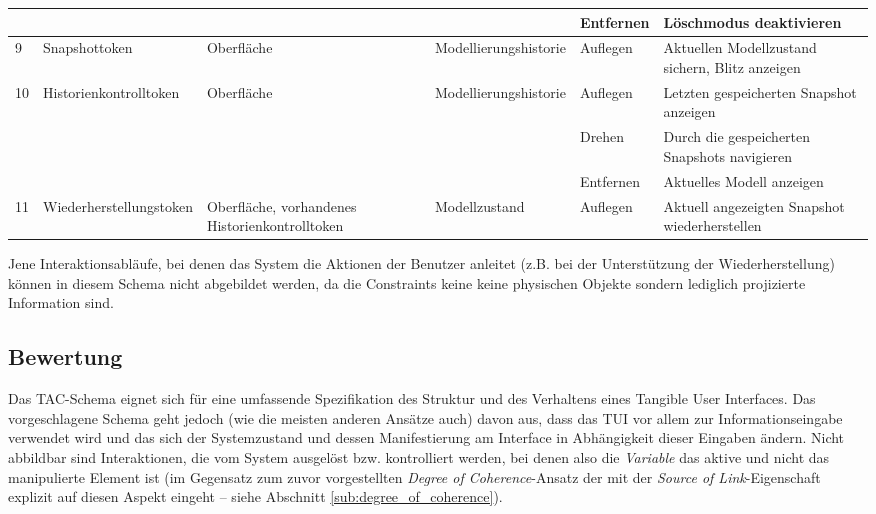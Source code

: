 \begin{longtable}{| p{} || p{} | p{2cm} || p{2cm} | p{2cm} | p{3cm} |}
		 				   &    	& 			 &  & Entfernen & Löschmodus deaktivieren \\ \hline
		9 & Snapshot\-token & Oberfläche & Modell\-ierungs\-historie & Auflegen & Aktuellen Modellzustand sichern, Blitz anzeigen \\ \hline
		\multirow{3}{*}{10} & Historien\-kontroll\-token & Oberfläche & Modell\-ierungs\-historie  & Auflegen & Letzten gespeicherten Snapshot anzeigen \\ \cline{5-6}
						   &   &			 &  & Drehen & Durch die gespeicherten Snapshots navigieren \\ \cline{5-6}
						   &   &			 &  & Entfernen & Aktuelles Modell anzeigen \\ \hline
		11 & Wieder\-herstellungs\-token & Oberfläche, vorhandenes Historien\-kontroll\-token & Modell\-zustand & Auflegen & Aktuell angezeigten Snapshot wiederherstellen \\ \hline

	\end{longtable}

Jene Interaktionsabläufe, bei denen das System die Aktionen der Benutzer anleitet (z.B. bei der Unterstützung der Wiederherstellung) können in diesem Schema nicht abgebildet werden, da die Constraints keine keine physischen Objekte sondern lediglich projizierte Information sind.

\subsection{Bewertung} %

Das \gls{TAC}-Schema eignet sich für eine umfassende Spezifikation des Struktur und des Verhaltens eines Tangible User Interfaces. Das vorgeschlagene Schema geht jedoch (wie die meisten anderen Ansätze auch) davon aus, dass das \gls{TUI} vor allem zur Informationseingabe verwendet wird und das sich der Systemzustand und dessen Manifestierung am Interface in Abhängigkeit dieser Eingaben ändern. Nicht abbildbar sind Interaktionen, die vom System ausgelöst bzw. kontrolliert werden, bei denen also die \emph{Variable} das aktive und nicht das manipulierte Element ist (im Gegensatz zum zuvor vorgestellten \emph{Degree of Coherence}-Ansatz der mit der \emph{Source of Link}-Eigenschaft explizit auf diesen Aspekt eingeht -- siehe Abschnitt \ref{sub:degree_of_coherence}).

